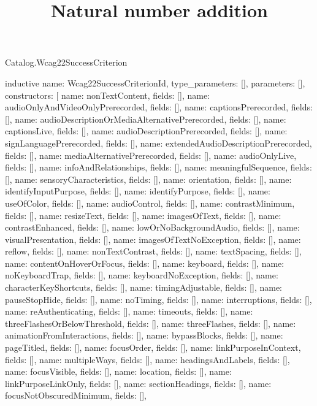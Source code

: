 \begin{lexlean}{Catalog.Wcag22SuccessCriterion}
\title{Natural number addition}
\begin{semanticmodule}
inductive{
  name: Wcag22SuccessCriterionId,
  type_parameters: [],
  parameters: [],
  constructors: [
    {name: nonTextContent, fields: []},
    {name: audioOnlyAndVideoOnlyPrerecorded, fields: []},
    {name: captionsPrerecorded, fields: []},
    {name: audioDescriptionOrMediaAlternativePrerecorded, fields: []},
    {name: captionsLive, fields: []},
    {name: audioDescriptionPrerecorded, fields: []},
    {name: signLanguagePrerecorded, fields: []},
    {name: extendedAudioDescriptionPrerecorded, fields: []},
    {name: mediaAlternativePrerecorded, fields: []},
    {name: audioOnlyLive, fields: []},
    {name: infoAndRelationships, fields: []},
    {name: meaningfulSequence, fields: []},
    {name: sensoryCharacteristics, fields: []},
    {name: orientation, fields: []},
    {name: identifyInputPurpose, fields: []},
    {name: identifyPurpose, fields: []},
    {name: useOfColor, fields: []},
    {name: audioControl, fields: []},
    {name: contrastMinimum, fields: []},
    {name: resizeText, fields: []},
    {name: imagesOfText, fields: []},
    {name: contrastEnhanced, fields: []},
    {name: lowOrNoBackgroundAudio, fields: []},
    {name: visualPresentation, fields: []},
    {name: imagesOfTextNoException, fields: []},
    {name: reflow, fields: []},
    {name: nonTextContrast, fields: []},
    {name: textSpacing, fields: []},
    {name: contentOnHoverOrFocus, fields: []},
    {name: keyboard, fields: []},
    {name: noKeyboardTrap, fields: []},
    {name: keyboardNoException, fields: []},
    {name: characterKeyShortcuts, fields: []},
    {name: timingAdjustable, fields: []},
    {name: pauseStopHide, fields: []},
    {name: noTiming, fields: []},
    {name: interruptions, fields: []},
    {name: reAuthenticating, fields: []},
    {name: timeouts, fields: []},
    {name: threeFlashesOrBelowThreshold, fields: []},
    {name: threeFlashes, fields: []},
    {name: animationFromInteractions, fields: []},
    {name: bypassBlocks, fields: []},
    {name: pageTitled, fields: []},
    {name: focusOrder, fields: []},
    {name: linkPurposeInContext, fields: []},
    {name: multipleWays, fields: []},
    {name: headingsAndLabels, fields: []},
    {name: focusVisible, fields: []},
    {name: location, fields: []},
    {name: linkPurposeLinkOnly, fields: []},
    {name: sectionHeadings, fields: []},
    {name: focusNotObscuredMinimum, fields: []},
}
\end{semanticmodule}
\end{lexlean}
